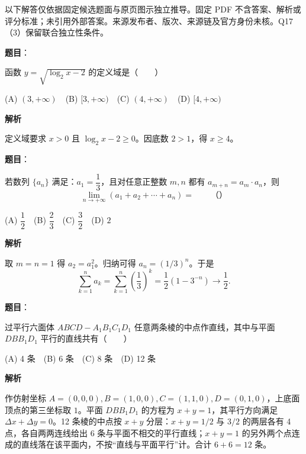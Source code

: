 

\begin{gktip}
以下解答仅依据固定候选题面与原页图示独立推导。固定 PDF 不含答案、解析或评分标准；未引用外部答案。来源发布者、版次、来源链及官方身份未核。Q17（3）保留联合独立性条件。
\end{gktip}

\begin{answer}

\textbf{题目}：

函数 $y=\sqrt{\log_2 x-2}$ 的定义域是\mbox{（　　）}

(A) $(3,+\infty)$　(B) $[3,+\infty)$　(C) $(4,+\infty)$　(D) $[4,+\infty)$

\textbf{解析}

定义域要求 $x>0$ 且 $\log_2x-2\ge0$。因底数 $2>1$，得 $x\ge4$。

\gkanswer{答案：D，$[4,+\infty)$。}

\end{answer}
\begin{answer}

\textbf{题目}：

若数列 $\{a_n\}$ 满足：$a_1=\dfrac13$，且对任意正整数 $m,n$ 都有 $a_{m+n}=a_m\cdot a_n$，则
\nopagebreak[4]
\[
\lim_{n\to+\infty}(a_1+a_2+\cdots+a_n)=\qquad（　　）
\]

(A) $\dfrac12$　(B) $\dfrac23$　(C) $\dfrac32$　(D) $2$

\textbf{解析}

取 $m=n=1$ 得 $a_2=a_1^2$。归纳可得 $a_n=(1/3)^n$。于是
\nopagebreak[4]
\[
\sum_{k=1}^n a_k=\sum_{k=1}^n\left(\frac13\right)^k
=\frac12\left(1-3^{-n}\right)\longrightarrow\frac12.
\]


\end{answer}
\begin{answer}

\textbf{题目}：

过平行六面体 $ABCD-A_1B_1C_1D_1$ 任意两条棱的中点作直线，其中与平面 $DBB_1D_1$ 平行的直线共有\mbox{（　　）}

(A) 4 条　(B) 6 条　(C) 8 条　(D) 12 条

\textbf{解析}

作仿射坐标 $A=(0,0,0),B=(1,0,0),C=(1,1,0),D=(0,1,0)$，上底面顶点的第三坐标取 $1$。平面 $DBB_1D_1$ 的方程为 $x+y=1$，其平行方向满足 $\Delta x+\Delta y=0$。12 条棱的中点按 $x+y$ 分层：$x+y=1/2$ 与 $3/2$ 的两层各有 4 点，各自两两连线给出 6 条与平面不相交的平行直线；$x+y=1$ 的另外两个点连成的直线落在该平面内，不按“直线与平面平行”计。合计 $6+6=12$ 条。


\end{answer}

